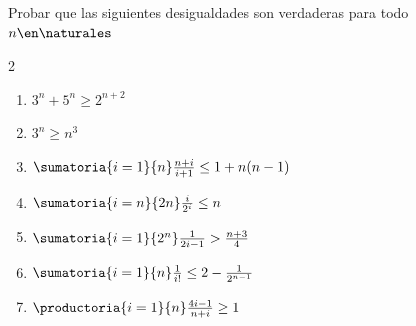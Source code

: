\begin{enunciado}{\ejercicio}
  Probar que las siguientes desigualdades son verdaderas para todo $n \en \naturales$
  \begin{multicols}{2}
    \begin{enumerate}[label=\roman*)]
      \item $3^n + 5^n \geq 2^{n+2}$
      \item $3^n \geq n^3$
      \item $ \sumatoria{i=1}{n} \frac{n+i}{i+1} \leq 1 + n(n-1)$
      \item $ \sumatoria{i=n}{2n} \frac{i}{2^i} \leq n$
      \item $ \sumatoria{i=1}{2^n} \frac{1}{2i-1} > \frac{n+3}{4}$
      \item $ \sumatoria{i=1}{n} \frac{1}{i!} \leq 2 - \frac{1}{2^{n-1}}$
      \item $ \productoria{i=1}{n} \frac{4i-1}{n+i} \geq 1$
    \end{enumerate}
  \end{multicols}
\end{enunciado}

